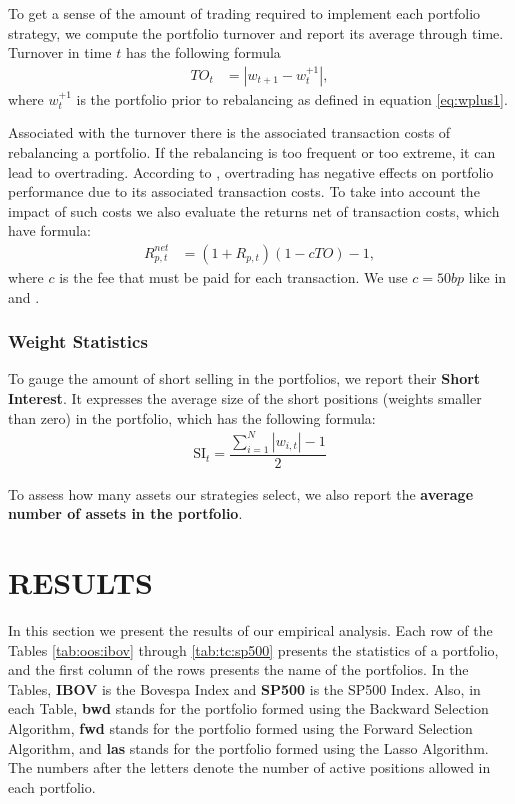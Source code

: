 \documentclass[12pt,oneside,a4paper]{memoir}
\begin{document}
To get a sense of the amount of trading required to implement each portfolio strategy, we compute the portfolio turnover and report its average through time.
Turnover in time $t$ has the following formula
\begin{align}
	\label{to}
	TO_{t} &= |w_{t+1} - w_{t}^{+1}|,
\end{align}
where $w_{t}^{+1}$ is the portfolio prior to rebalancing as defined in equation \eqref{eq:wplus1}.

Associated with the turnover there is the associated transaction costs of rebalancing a portfolio.
If the rebalancing is too frequent or too extreme, it can lead to overtrading.
According to , overtrading has negative effects on portfolio performance due to its associated transaction costs.
To take into account the impact of such costs we also evaluate the returns net of transaction costs, which have formula:
\begin{align}
	R^{net}_{p,t} &= (1 + R_{p,t} )(1 - c TO) - 1,
\end{align}
where $c$ is the fee that must be paid for each transaction.
We use $c=50bp$ like in  and .

\subsubsection*{Weight Statistics}

To gauge the amount of short selling in the portfolios, we report their \textbf{Short Interest}.
It expresses the average size of the short positions (weights smaller than zero) in the portfolio, which has the following formula:
\begin{align}
	\text{SI}_{t} = \dfrac{\sum_{i=1}^{N} |w_{i,t}| - 1}{2}
\end{align}

To assess how many assets our strategies select, we also report the \textbf{average number of assets in the portfolio}.

\section{RESULTS} \label{sec:results}

In this section we present the results of our empirical analysis.
Each row of the Tables \ref{tab:oos:ibov} through \ref{tab:tc:sp500} presents the statistics of a portfolio, and the first column of the rows presents the name of the portfolios.
In the Tables, \textbf{IBOV} is the Bovespa Index and \textbf{SP500} is the SP500 Index. 
Also, in each Table,
\textbf{bwd} stands for the portfolio formed using the Backward Selection Algorithm, 
\textbf{fwd} stands for the portfolio formed using the Forward Selection Algorithm, and
\textbf{las} stands for the portfolio formed using the Lasso Algorithm.
The numbers after the letters denote the number of active positions allowed in each portfolio.
\end{document}
